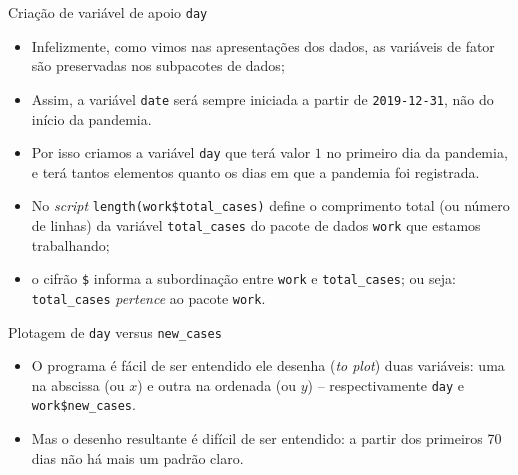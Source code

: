\documentclass[a4paper,10pt]{beamer}
\begin{document}
\begin{frame}{ Criação de variável de apoio {\tt day}}
  
  
  \begin{itemize}
      \item Infelizmente, como vimos nas apresentações dos dados, as variáveis
	  de fator são preservadas nos subpacotes de dados;
	  
      \item Assim, a variável {\tt date} será sempre iniciada a partir de 
	  {\tt 2019-12-31}, não do início da pandemia.
	  
      \item Por isso criamos a variável {\tt day} que terá valor $1$ no 
	  primeiro dia da pandemia, e terá tantos elementos quanto os dias 
	  em que a pandemia foi registrada.
	  
      \item No {\em script} {\tt length(work\$total\_cases)} 
	  define o comprimento total (ou número de linhas) da variável 
	  {\tt total\_cases} do pacote de dados {\tt work} que estamos 
	  trabalhando;
      \item o cifrão {\tt \$} informa a subordinação entre {\tt work} e 
	  {\tt total\_cases}; ou seja: {\tt total\_cases} {\em pertence} 
	  ao pacote {\tt work}.
  \end{itemize}

\end{frame}

\begin{frame}{ Plotagem de {\tt day} versus {\tt new\_cases}}
  
  
  \begin{itemize}
      \item O programa é fácil de ser entendido ele desenha ({\em to plot})
	  duas variáveis: uma na abscissa (ou $x$) e outra na ordenada 
	  (ou $y$) -- respectivamente {\tt day} e 
	  {\tt work\$new\_cases}.
      \item Mas o desenho resultante é difícil de ser entendido: a partir 
	  dos primeiros 70 dias não há mais um padrão claro.
  \end{itemize}

\end{frame}
\end{document}
